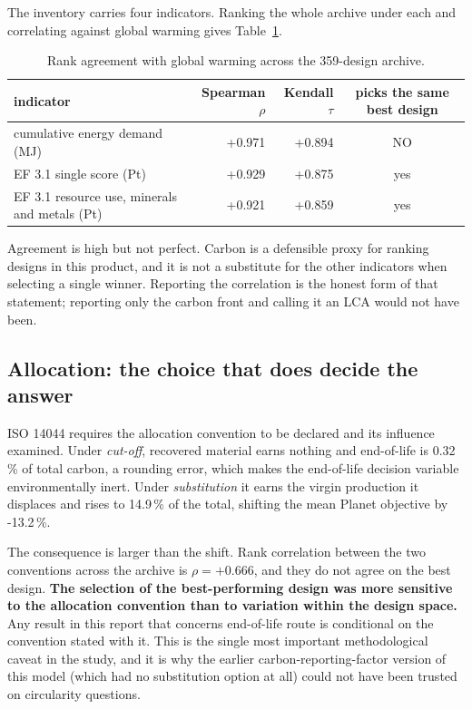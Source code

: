 \documentclass[11pt,a4paper]{article}
\begin{document}
The inventory carries four indicators. Ranking the whole archive under each and
correlating against global warming gives Table~\ref{tab:indrank}.

\begin{table}[h]
\centering\small
\caption{Rank agreement with global warming across the 359-design archive.}
\label{tab:indrank}
\begin{tabular}{lrrc}
\toprule
indicator & Spearman $\rho$ & Kendall $\tau$ & picks the same best design \\
\midrule
cumulative energy demand (MJ) & +0.971 & +0.894 & NO \\
EF 3.1 single score (Pt) & +0.929 & +0.875 & yes \\
EF 3.1 resource use, minerals and metals (Pt) & +0.921 & +0.859 & yes \\
\bottomrule
\end{tabular}
\end{table}

Agreement is high but not perfect. Carbon is a defensible proxy for ranking
designs in this product, and it is not a substitute for the other indicators
when selecting a single winner. Reporting the correlation is the honest form of
that statement; reporting only the carbon front and calling it an LCA would not
have been.

\subsection{Allocation: the choice that does decide the answer}

ISO 14044 requires the allocation convention to be declared and its influence
examined. Under \emph{cut-off}, recovered material earns nothing and
end-of-life is 0.32\,\% of total carbon, a rounding error, which
makes the end-of-life decision variable environmentally inert. Under
\emph{substitution} it earns the virgin production it displaces and rises to
14.9\,\% of the total, shifting the mean Planet objective by
-13.2\,\%.

The consequence is larger than the shift. Rank correlation between the two
conventions across the archive is $\rho=+0.666$, and they do not agree on
the best design. \textbf{The selection of the best-performing design was more
sensitive to the allocation convention than to variation within the design
space.} Any result in this report that concerns end-of-life route
is conditional on the convention stated with it. This is the single most
important methodological caveat in the study, and it is why the earlier
carbon-reporting-factor version of this model (which had no substitution
option at all) could not have been trusted on circularity questions.
\end{document}
